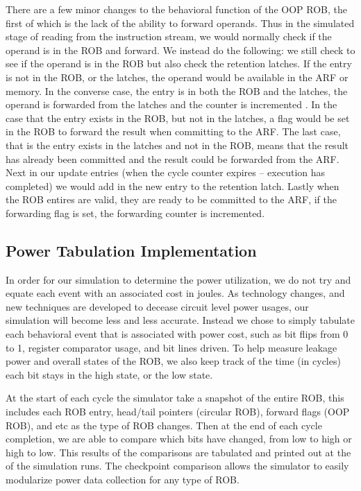 There are a few minor changes to the behavioral function of the OOP ROB, the first of which is the lack of the ability to forward operands.  Thus in the simulated stage of reading from the instruction stream, we would normally check if the operand is in the ROB and forward.  We instead do the following: we still check to see if the operand is in the ROB but also check the retention latches. If the entry is not in the ROB, or the latches, the operand would be available in the ARF or memory.  In the converse case,  the entry is in both the ROB and the latches, the operand is forwarded from the latches and the counter is incremented .  In the case that the entry exists in the ROB, but not in the latches, a flag would be set in the ROB to forward the result when committing to the ARF. The last case, that is the entry exists in the latches and not in the ROB, means that the result has already been committed and the result could be forwarded from the ARF.  Next in our update entries (when the cycle counter expires -- execution has completed) we would add in the new entry to the retention latch.  Lastly when the ROB entires are valid, they are ready to be committed to the ARF,
if the forwarding flag is set, the forwarding counter is incremented.

\subsection{Power Tabulation Implementation}
In order for our simulation to determine the power utilization, we do not try and equate each event with an associated cost in joules.  As technology changes, and new techniques are developed to decease circuit level power usages, our simulation will become less and less accurate.  Instead we chose to simply tabulate each behavioral event that is associated with power cost, such as bit flips from 0 to 1, register comparator usage, and bit lines driven.  To help measure leakage power and overall states of the ROB, we also keep track of the time (in cycles) each bit stays in the high state, or the low state.

At the start of each cycle the simulator take a snapshot of the entire ROB, this includes each ROB entry, head/tail pointers (circular ROB), forward flags (OOP ROB), and etc as the type of ROB changes.  Then at the end of each cycle completion, we are able to compare which bits have changed, from low to high or high to low.   This results of the comparisons are tabulated
and printed out at the of the simulation runs.  The checkpoint comparison allows the simulator to easily modularize power data collection for any type of ROB.

